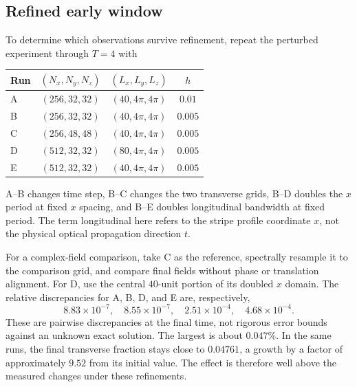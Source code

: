 \documentclass[10pt,letterpaper]{article}
\numberwithin{equation}{section}
\begin{document}
\subsection{Refined early window}
To determine which observations survive refinement, repeat the perturbed experiment through $T=4$ with
\begin{center}\small
\begin{tabular}{lccc}\toprule
Run & $(N_x,N_y,N_z)$ & $(L_x,L_y,L_z)$ & $h$\\\midrule
A & $(256,32,32)$ & $(40,4\pi,4\pi)$ & $0.01$\\
B & $(256,32,32)$ & $(40,4\pi,4\pi)$ & $0.005$\\
C & $(256,48,48)$ & $(40,4\pi,4\pi)$ & $0.005$\\
D & $(512,32,32)$ & $(80,4\pi,4\pi)$ & $0.005$\\
E & $(512,32,32)$ & $(40,4\pi,4\pi)$ & $0.005$\\\bottomrule
\end{tabular}\end{center}
A--B changes time step, B--C changes the two transverse grids, B--D doubles the $x$ period at fixed $x$ spacing, and B--E doubles longitudinal bandwidth at fixed period. The term longitudinal here refers to the stripe profile coordinate $x$, not the physical optical propagation direction $t$.

\begin{table}[!htbp]\centering\small
\caption{Early optical results at $T=4$. Run labels refer to the explicit configurations above. These comparisons support approximately $4.76\%$ transverse variation, not every digit of an extrapolated continuum answer.}\label{tab:early}\end{table}

For a complex-field comparison, take C as the reference, spectrally resample it to the comparison grid, and compare final fields without phase or translation alignment. For D, use the central $40$-unit portion of its doubled $x$ domain. The relative discrepancies for A, B, D, and E are, respectively,
\begin{equation}
 8.83\times10^{-7},\quad 8.55\times10^{-7},\quad
 2.51\times10^{-4},\quad4.68\times10^{-4}.
\end{equation}
These are pairwise discrepancies at the final time, not rigorous error bounds against an unknown exact solution. The largest is about $0.047\%$. In the same runs, the final transverse fraction stays close to $0.04761$, a growth by a factor of approximately $9.52$ from its initial value. The effect is therefore well above the measured changes under these refinements.
\end{document}

